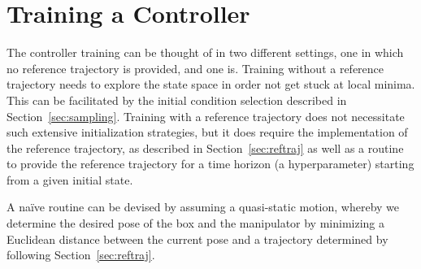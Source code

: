 \section{Training a Controller} 
\label{sec:control}
%
The controller training can be thought of in two different settings, one in 
which no reference trajectory is provided, and one is. Training without a 
reference trajectory needs to explore the state space in order not get stuck at 
local minima. This can be facilitated by the initial condition selection 
described in Section~\ref{sec:sampling}. Training with a reference trajectory 
does not necessitate such extensive initialization strategies, but it does 
require the implementation of the reference trajectory, as described in
Section~\ref{sec:reftraj} as well as a routine to provide the reference
trajectory for a time horizon (a hyperparameter) starting from a given initial
state.


A na\"{i}ve routine can be devised by assuming a quasi-static motion, whereby we
determine the desired pose of the box and the manipulator by minimizing a 
Euclidean distance between the current pose and a trajectory determined by 
following Section~\ref{sec:reftraj}. 


